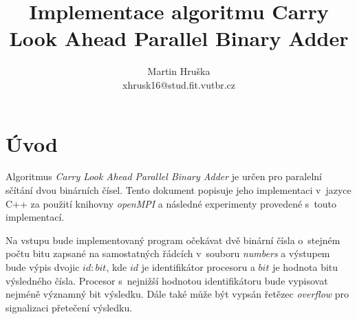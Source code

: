\documentclass[a4paper, 12pt]{article}
\title{Implementace algoritmu Carry Look Ahead Parallel Binary Adder}
\author{Martin Hruška\\xhrusk16@stud.fit.vutbr.cz}
\date{}
\begin{document}
\maketitle

\section{Úvod}
\label{sec:intro}
Algoritmus \emph{Carry Look Ahead Parallel Binary Adder} je určen pro paralelní sčítání dvou binárních čísel.
Tento dokument popisuje jeho implementaci v~jazyce C++ za použití knihovny \emph{openMPI} a následné experimenty
provedené s~touto implementací.

Na vstupu bude implementovaný program očekávat dvě binární čísla o~stejném počtu bitu zapsané na samostatných
řádcích v~souboru \emph{numbers} a výstupem bude výpis dvojic $id:bit$, kde $id$ je identifikátor procesoru
a $bit$ je hodnota bitu výsledného čísla.
Procesor s~nejnižší hodnotou identifikátoru bude vypisovat nejméně významný bit výsledku.
Dále také může být vypsán řetězec \emph{overflow} pro signalizaci přetečení výsledku.

\end{document}
